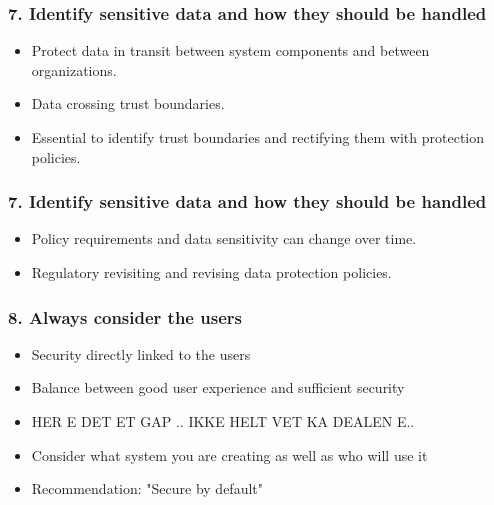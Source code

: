 \documentclass[12pt,norsk]{beamer}
\begin{document}
\begin{frame}

	\frametitle{7. Identify sensitive data and how they should be handled}
	\begin{itemize}

		\item Protect data in transit between system components and between organizations.
		\item Data crossing trust boundaries.
		\item Essential to identify trust boundaries and rectifying them with protection policies.
		
		
		
	\end{itemize}
	

\end{frame}


\begin{frame}

	\frametitle{7. Identify sensitive data and how they should be handled}
	\begin{itemize}

		\item Policy requirements and data sensitivity can change over time.
		\item Regulatory revisiting and revising data protection policies.		
		
	\end{itemize}
	

\end{frame}

\begin{frame}

	\frametitle{8. Always consider the users}
	
	\begin{itemize}
	
	\item Security directly linked to the users
	\item Balance between good user experience and sufficient security
	\item HER E DET ET GAP .. IKKE HELT VET KA DEALEN E..	
	
	\item Consider what system you are creating as well as who will use it
	\item Recommendation: "Secure by default"
	
	\end{itemize}

\end{frame}
\end{document}
